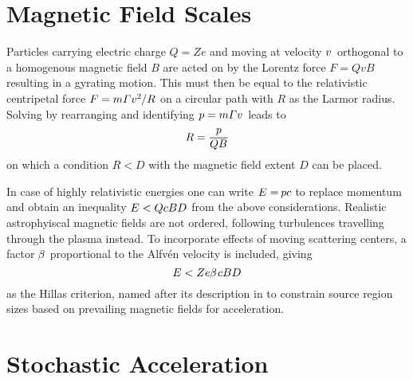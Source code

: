 \section{Magnetic Field Scales}
\label{sec:fields}

Particles carrying electric charge $Q = Ze$ and moving at velocity $v \kern+1.0pt$ orthogonal to a homogenous magnetic field $B$ are
acted on by the Lorentz force $F = QvB$ resulting in a gyrating motion. This must then be equal to the relativistic centripetal force
$F = m \varGamma v^2 \kern-0.5pt / R$ on a circular path with $R$ as the Larmor radius. Solving by rearranging and identifying
$p = m \varGamma v \kern+0.5pt$ leads to
\begin{equation*}
	R = \frac{p}{\raisebox{0.3ex}{$QB \kern+0.3pt$}}
\end{equation*}
on which a condition $R < D$ with the magnetic field extent $D$ can be placed.


\newpage


In case of highly relativistic energies one can write $E = \kern-0.8pt pc$ to replace momentum and obtain an inequality
$E < QcBD \kern+0.5pt$ from the above considerations. Realistic astrophyiscal magnetic fields are not ordered, following
turbulences travelling through the plasma instead. To incorporate effects of moving scattering centers, a factor
$\kern-0.5pt \beta \kern+0.5pt$ proportional to the Alfvén velocity is included, giving
\begin{equation}
	E < Ze \kern-0.3pt \beta \kern+0.9pt cBD
	\label{eqn:hillas}
\end{equation}
as the Hillas criterion, named after its description in \cite{Hillas_1984} to constrain source region sizes based on prevailing
magnetic fields for  acceleration.



\section{Stochastic Acceleration}
\label{sec:stochastic}

